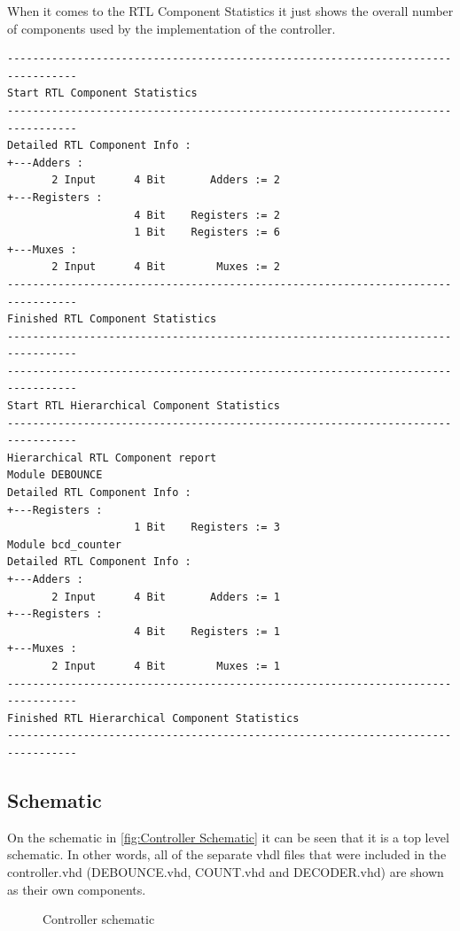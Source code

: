 \documentclass[10pt]{article}
\begin{document}
When it comes to the RTL Component Statistics it just shows the overall number of components used by the implementation of the controller.

\begin{verbatim}
---------------------------------------------------------------------------------
Start RTL Component Statistics 
---------------------------------------------------------------------------------
Detailed RTL Component Info : 
+---Adders : 
	   2 Input      4 Bit       Adders := 2     
+---Registers : 
	                4 Bit    Registers := 2     
	                1 Bit    Registers := 6     
+---Muxes : 
	   2 Input      4 Bit        Muxes := 2     
---------------------------------------------------------------------------------
Finished RTL Component Statistics 
---------------------------------------------------------------------------------
---------------------------------------------------------------------------------
Start RTL Hierarchical Component Statistics 
---------------------------------------------------------------------------------
Hierarchical RTL Component report 
Module DEBOUNCE 
Detailed RTL Component Info : 
+---Registers : 
	                1 Bit    Registers := 3     
Module bcd_counter 
Detailed RTL Component Info : 
+---Adders : 
	   2 Input      4 Bit       Adders := 1     
+---Registers : 
	                4 Bit    Registers := 1     
+---Muxes : 
	   2 Input      4 Bit        Muxes := 1     
---------------------------------------------------------------------------------
Finished RTL Hierarchical Component Statistics
---------------------------------------------------------------------------------
\end{verbatim}
\newpage

\subsection{Schematic}

On the schematic in \autoref{fig:Controller Schematic} it can be seen that it is a top level schematic. In other words, all of the separate vhdl files that were included in the controller.vhd (DEBOUNCE.vhd, COUNT.vhd and DECODER.vhd) are shown as their own components.

\begin{figure}[ht]
    \centering
    \caption{Controller schematic}
    \label{fig:Controller Schematic}
\end{figure}
\end{document}
